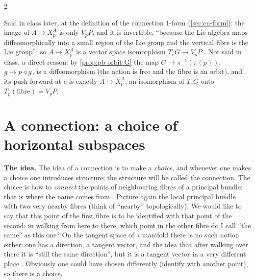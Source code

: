 \begin{paracol}{2}
\begin{aside}
Said in class later, at the definition of the connection 1-form (\cref{sec:cn-form}): the image of $A\mapsto X^A_p$ is only $V_pP$, and it is invertible, ``because the Lie algebra maps diffeomorphically into a small region of the Lie group and the vertical fibre is the Lie group''; so $A\mapsto X^A_p$ is a vector space isomorphism $T_eG\to V_pP$  . Not said in class, a direct reason: by \cref{prop:pb-orbit-G} the map $G\to\pi^{-1}(\pi(p))$, $g\mapsto p\mathbin{\triangleleft} g$, is a diffeomorphism (the action is free and the fibre is an orbit), and its push-forward at $e$ is exactly $A\mapsto X^A_p$, an isomorphism of $T_eG$ onto $T_p(\text{fibre})=V_pP$.
\end{aside}

\section{A connection: a choice of horizontal subspaces}\label{sec:cn-def}

\textbf{The idea.} The idea of a connection is to make a \emph{choice}, and whenever one makes a choice one introduces structure; the structure will be called the connection. The choice is how to \emph{connect} the points of neighbouring fibres of a principal bundle: that is where the name comes from   . Picture again the local principal bundle with two very nearby fibres (think of ``nearby'' topologically). We would like to say that this point of the first fibre is to be identified with that point of the second: in walking from here to there, which point in the other fibre do I call ``the same'' as this one? On the tangent space of a manifold there is no such notion either: one has a direction, a tangent vector, and the idea that after walking over there it is ``still the same direction'', but it is a tangent vector in a very different place     . Obviously one could have chosen differently (identify with another point), so there is a choice.


\end{paracol}
